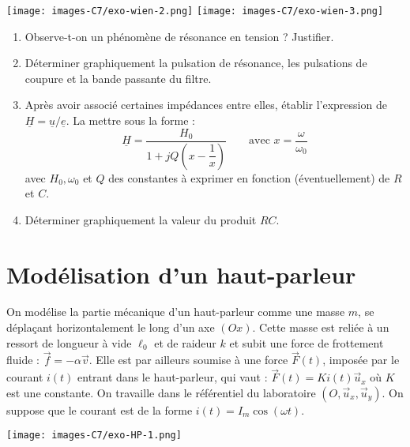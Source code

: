 \documentclass[
  10pt,
  a4paper,
  DIV=18]{scrartcl}
\providecommand{\tightlist}{%
  \setlength{\itemsep}{0pt}\setlength{\parskip}{0pt}}
\begin{document}
\begin{center}

\texttt{[image: images-C7/exo-wien-2.png]}
\texttt{[image: images-C7/exo-wien-3.png]}

\end{center}

\begin{enumerate}
\def\labelenumi{\arabic{enumi}.}
\setcounter{enumi}{1}
\tightlist
\item
  Observe-t-on un phénomène de résonance en tension ? Justifier.
\item
  Déterminer graphiquement la pulsation de résonance, les pulsations de
  coupure et la bande passante du filtre.
\item
  Après avoir associé certaines impédances entre elles, établir
  l'expression de \(\underline{H} = \underline{u} / \underline{e}\). La
  mettre sous la forme :
  \[\underline{H} = \dfrac{H_0}{1 + jQ\left(x - \dfrac{1}{x}\right)} \qquad \text{avec } x = \dfrac{\omega}{\omega_0}\]
  avec \(H_0,\omega_0\) et \(Q\) des constantes à exprimer en fonction
  (éventuellement) de \(R\) et \(C\).
\item
  Déterminer graphiquement la valeur du produit \(RC\).
\end{enumerate}

\hypertarget{sec:haut-parleur}{%
\section{Modélisation d'un haut-parleur}\label{sec:haut-parleur}}

\begin{multicols}{2}

On modélise la partie mécanique d'un haut-parleur comme une masse \(m\),
se déplaçant horizontalement le long d'un axe \((Ox)\). Cette masse est
reliée à un ressort de longueur à vide \(\ell_0\) et de raideur \(k\) et
subit une force de frottement fluide : \(\vec{f} = -\alpha \vec{v}\).
Elle est par ailleurs soumise à une force \(\vec{F}(t)\), imposée par le
courant \(i(t)\) entrant dans le haut-parleur, qui vaut :
\(\vec{F}(t) = K i(t) \vec{u}_x\) où \(K\) est une constante. On
travaille dans le référentiel du laboratoire
\((O, \vec{u}_x , \vec{u}_y)\). On suppose que le courant est de la
forme \(i(t) = I_m \cos(\omega t)\).

\begin{center}

\texttt{[image: images-C7/exo-HP-1.png]}

\end{center}

\end{multicols}
\end{document}
